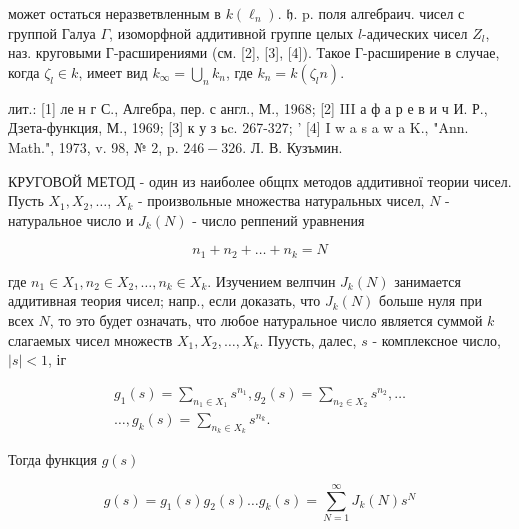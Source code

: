 \documentclass[10pt]{article}
\begin{document}
может остаться неразветвленным в $k\left(\ell_{n}\right)$. $\mathfrak{h}$. p. поля алгебраич. чисел с группой Галуа $\Gamma$, изоморфной аддитивной группе целых $l$-адических чисел $Z_{l}$, наз. круговыми Г-расширениями (см. [2], [3], [4]). Такое Г-расширение в случае, когда $\zeta_{l} \in k$, имеет вид $k_{\infty}=\bigcup_{n} k_{n}$, где $k_{n}=k\left(\zeta_{l} n\right)$.



лит.: [1] ле н г С., Алгебра, пер. с англ., М., 1968; [2] III а ф а р е в и ч И. Р., Дзета-функция, М., 1969; [3] к у з ьc. 267-327; ' [4] I w a s a w a K., "Ann. Math.", 1973, v. 98, № 2, p. $246-326$. Л. В. Кузъмин.



КРУГОВОЙ МЕТОД - один из наиболее общпх методов аддитивної теории чисел. Пусть $X_{1}, X_{2}, \ldots$, $X_{k}$ - произвольные множества натуральных чисел, $N$ - натуральное число и $J_{k}(N)$ - число реппений уравнения



\[

n_{1}+n_{2}+\ldots+n_{k}=N

\]



где $n_{1} \in X_{1}, n_{2} \in X_{2}, \ldots, n_{k} \in X_{k}$. Изучением велпчин $J_{k}(N)$ занимается аддитивная теория чисел; напр., если доказать, что $J_{k}(N)$ больше нуля при всех $N$, то это будет означать, что любое натуральное число является суммой $k$ слагаемых чисел множеств $X_{1}, X_{2}, \ldots, X_{k}$. Пуусть, далес, $s$ - комплексное число, $|s|<1$, іг



\[

\begin{gathered}

g_{1}(s)=\sum_{n_{1} \in X_{1}} s^{n_{1}}, g_{2}(s)=\sum_{n_{2} \in X_{2}} s^{n_{2}}, \ldots \\

\ldots, g_{k}(s)=\sum_{n_{k} \in X_{k}} s^{n_{k}} .

\end{gathered}

\]



Тогда функция $g(s)$



\[

g(s)=g_{1}(s) g_{2}(s) \ldots g_{k}(s)=\sum_{N=1}^{\infty} J_{k}(N) s^{N}

\]
\end{document}
